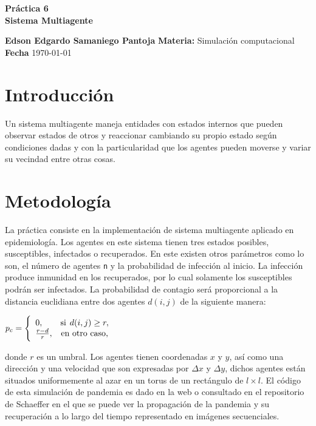 \documentclass[a4paper, 11pt]{article}
\begin{document}
\begin{center}
\LARGE \bf Pr\'actica 6\\ Sistema Multiagente 
\end{center}

\vspace{1cm} 
\noindent\textbf {Edson Edgardo Samaniego Pantoja} \hfill \textbf{Materia:} Simulación computacional 
\hfill \\
\textbf{Fecha} \today  
\vspace{1cm} 

\section{Introducción}
Un sistema multiagente maneja entidades con estados internos que pueden observar estados de otros y reaccionar cambiando su propio estado según condiciones dadas y con la particularidad que los agentes pueden moverse y variar su vecindad entre otras cosas.

\section{Metodología}
La práctica consiste en la implementación de sistema multiagente aplicado en epidemiología. Los agentes en este sistema tienen tres estados posibles, susceptibles, infectados o recuperados.
En este existen otros parámetros como lo son, el número de agentes \texttt{n} y la probabilidad de infección al inicio. La infección produce inmunidad en los recuperados, por lo cual solamente los susceptibles podrán ser infectados. La probabilidad de contagio será proporcional a la distancia euclidiana entre dos agentes \texttt{$d(i,j) $} de la siguiente manera:

\bigskip
$ p_c = 
\Bigg\{
\begin{array}{lc}

  0,  &        \text{si}\hspace{.15cm} d(i,j)\geq r,\\
  \frac{r-d}{r}, &  \text{en otro caso,}
\end{array}$

\bigskip
donde $r$ es un umbral. Los agentes tienen coordenadas \texttt{$x$} y \texttt{$y$}, así como una dirección y una velocidad que son expresadas por \texttt{$\Delta x$} y \texttt{$\Delta y$}, dichos agentes están situados uniformemente al azar en un torus de un rectángulo de \texttt{$l\times l$}. 
El código de esta simulación de pandemia es dado en la web \cite{elisa} o consultado en el repositorio de Schaeffer \cite{dra} en el que se puede ver la propagación de la pandemia y su recuperación a lo largo del tiempo representado en imágenes secuenciales.
\end{document}
